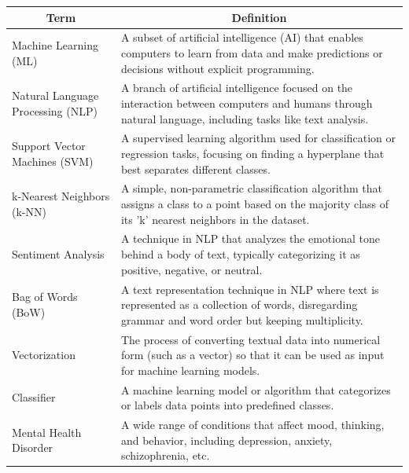 \begin{center}

\begin{tabular}{|p{4cm}|p{10cm}|}
  \hline
  \multicolumn{1}{|c|}{\textbf{Term}} & \multicolumn{1}{c|}{\textbf{Definition}} \\
  
  \hline
  Machine Learning (ML) & A subset of artificial intelligence (AI) that enables computers to learn from data and make predictions or decisions without explicit programming. \\

  \hline 
  Natural Language Processing (NLP) & A branch of artificial intelligence focused on the interaction between computers and humans through natural language, including tasks like text analysis. \\

  \hline 
  Support Vector Machines (SVM) & A supervised learning algorithm used for classification or regression tasks, focusing on finding a hyperplane that best separates different classes. \\

  \hline 
  k-Nearest Neighbors (k-NN) & A simple, non-parametric classification algorithm that assigns a class to a point based on the majority class of its 'k' nearest neighbors in the dataset. \\

  \hline 
  Sentiment Analysis & A technique in NLP that analyzes the emotional tone behind a body of text, typically categorizing it as positive, negative, or neutral. \\

  \hline 
  Bag of Words (BoW) & A text representation technique in NLP where text is represented as a collection of words, disregarding grammar and word order but keeping multiplicity. \\

  \hline 
  Vectorization & The process of converting textual data into numerical form (such as a vector) so that it can be used as input for machine learning models. \\

  \hline 
  Classifier & A machine learning model or algorithm that categorizes or labels data points into predefined classes. \\

  \hline
  Mental Health Disorder & A wide range of conditions that affect mood, thinking, and behavior, including depression, anxiety, schizophrenia, etc. \\


\end{tabular}
\end{center}

